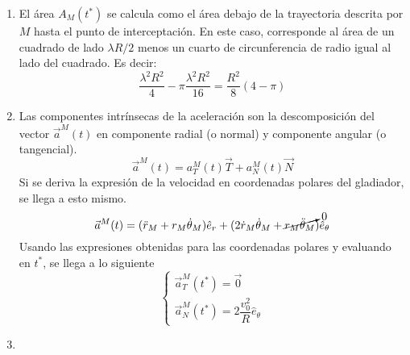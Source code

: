 \documentclass{article}
\begin{document}
\begin{enumerate}
\begin{enumerate}
        \item El área $A_M(t^*)$ se calcula como el área debajo de la trayectoria descrita por $M$ hasta el punto de interceptación. En este caso, corresponde al área de un cuadrado de lado $\lambda R/2$ menos un cuarto de circunferencia de radio igual al lado del cuadrado. Es decir:
        $$
        \frac{\lambda ^2 R^2 }{4}-\pi \frac{\lambda ^2 R^2 }{16}=\boxed{\frac{R^2}{8}(4-\pi )}
        $$

        \item Las componentes intrínsecas de la aceleración son la descomposición del vector $\vec{a}^M(t)$ en componente radial (o normal) y componente angular (o tangencial). 
        $$
        \vec{a}^M(t)=a_T^M (t)\vec{T}+a_N^M (t) \vec{N}
        $$
        Si se deriva la expresión de la velocidad en coordenadas polares del gladiador, se llega a esto mismo.
        $$
        \vec{a}^M(t)=(\ddot{r}_M+r_M\dot{\theta}_M) \hat{e}_r+(2\dot{r}_M\dot{\theta }_M+\cancelto{0}{r_M \ddot{\theta }_M})\hat{e}_\theta 
        $$
        Usando las expresiones obtenidas para las coordenadas polares y evaluando en $t^*$, se llega a lo siguiente
        $$
        \boxed{
        \begin{cases}
            \vec{a}_T^M(t^*)=\vec{0}\\
            \vec{a}_N^M(t^*)=2\dfrac{v_0^2}{R} \hat{e}_\theta 
        \end{cases}
        }
        $$

        \item 
    \end{enumerate}
\end{enumerate}
\end{document}
